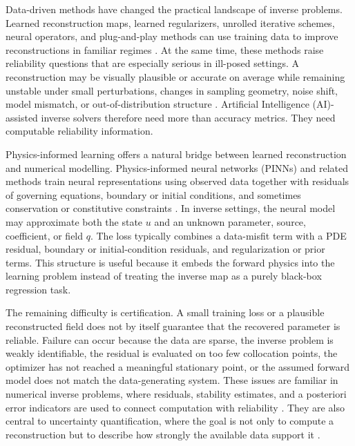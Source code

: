 \documentclass{article}
\numberwithin{equation}{section}
\theoremstyle{definition}
\begin{document}
Data-driven methods have changed the practical landscape of inverse problems. Learned reconstruction maps, learned regularizers, unrolled iterative schemes, neural operators, and plug-and-play methods can use training data to improve reconstructions in familiar regimes \cite{ArridgeMaassOktemSchonlieb2019,AdlerOktem2018,LiKovachkiAzizzadenesheli2021}. At the same time, these methods raise reliability questions that are especially serious in ill-posed settings. A reconstruction may be visually plausible or accurate on average while remaining unstable under small perturbations, changes in sampling geometry, noise shift, model mismatch, or out-of-distribution structure \cite{AntunRennaPoonAdcockHansen2020}. Artificial Intelligence (AI)-assisted inverse solvers therefore need more than accuracy metrics. They need computable reliability information.

Physics-informed learning offers a natural bridge between learned reconstruction and numerical modelling. Physics-informed neural networks (PINNs) and related methods train neural representations using observed data together with residuals of governing equations, boundary or initial conditions, and sometimes conservation or constitutive constraints \cite{RaissiPerdikarisKarniadakis2019,KarniadakisKevrekidisLuPerdikarisWangYang2021}. In inverse settings, the neural model may approximate both the state \(u\) and an unknown parameter, source, coefficient, or field \(q\). The loss typically combines a data-misfit term with a PDE residual, boundary or initial-condition residuals, and regularization or prior terms. This structure is useful because it embeds the forward physics into the learning problem instead of treating the inverse map as a purely black-box regression task.

The remaining difficulty is certification. A small training loss or a plausible reconstructed field does not by itself guarantee that the recovered parameter is reliable. Failure can occur because the data are sparse, the inverse problem is weakly identifiable, the residual is evaluated on too few collocation points, the optimizer has not reached a meaningful stationary point, or the assumed forward model does not match the data-generating system. These issues are familiar in numerical inverse problems, where residuals, stability estimates, and a posteriori error indicators are used to connect computation with reliability \cite{EnglHankeNeubauer1996,Kirsch2011,Verfuerth2013}. They are also central to uncertainty quantification, where the goal is not only to compute a reconstruction but to describe how strongly the available data support it \cite{KaipioSomersalo2005,Sullivan2015,Stuart2010}.
\end{document}
